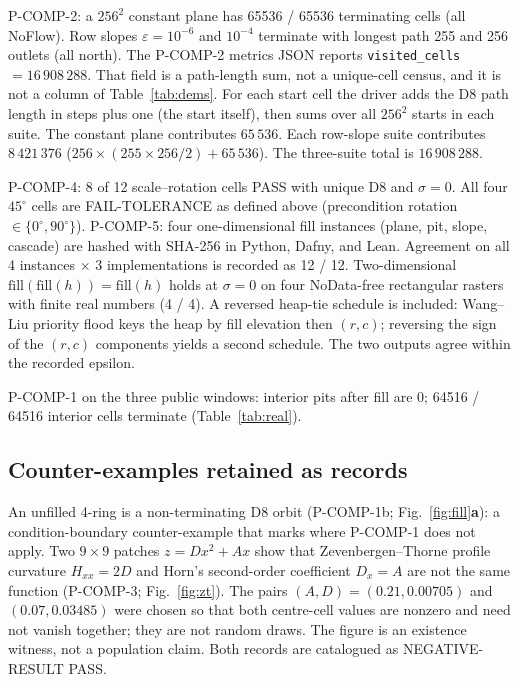 \documentclass[11pt,a4paper]{article}
\begin{document}
P-COMP-2: a $256^{2}$ constant plane has 65536 / 65536 terminating cells
(all NoFlow). Row slopes $\varepsilon=10^{-6}$ and $10^{-4}$ terminate
with longest path 255 and 256 outlets (all north). The P-COMP-2 metrics JSON reports \texttt{visited\_cells} $=16\,908\,288$.
That field is a path-length sum, not a unique-cell census, and it is not
a column of Table~\ref*{tab:dems}. For each start cell the driver adds the
D8 path length in steps plus one (the start itself), then sums over all
$256^{2}$ starts in each suite. The constant plane contributes
$65\,536$. Each row-slope suite contributes $8\,421\,376$
($256\times(255\times256/2)+65\,536$). The three-suite total is
$16\,908\,288$.

P-COMP-4: 8 of 12 scale--rotation cells PASS with unique D8 and
$\sigma=0$. All four $45^{\circ}$ cells are FAIL-TOLERANCE as defined
above (precondition rotation $\in\{0^{\circ},90^{\circ}\}$). P-COMP-5:
four one-dimensional fill instances (plane, pit, slope,
cascade) are hashed with SHA-256 in Python, Dafny, and Lean. Agreement
on all 4 instances $\times$ 3 implementations is recorded as 12 / 12.
Two-dimensional $\mathrm{fill}(\mathrm{fill}(h))=\mathrm{fill}(h)$ holds
at $\sigma=0$ on four NoData-free rectangular rasters with finite real
numbers (4 / 4). A reversed heap-tie schedule is included: Wang--Liu
priority flood keys the heap by fill elevation then $(r,c)$; reversing
the sign of the $(r,c)$ components yields a second schedule. The two
outputs agree within the recorded epsilon.

P-COMP-1 on the three public windows: interior pits after fill are 0;
64516 / 64516 interior cells terminate (Table~\ref*{tab:real}).

\subsection{Counter-examples retained as records}

An unfilled 4-ring is a non-terminating D8 orbit (P-COMP-1b;
Fig.~\ref*{fig:fill}\textbf{a}): a condition-boundary counter-example that
marks where P-COMP-1 does not apply. Two $9\times9$ patches
$z=Dx^{2}+Ax$ show that Zevenbergen--Thorne profile curvature
$H_{xx}=2D$ and Horn's second-order coefficient $D_x=A$ are not the same
function (P-COMP-3; Fig.~\ref*{fig:zt}). The pairs
$(A,D)=(0.21,0.00705)$ and $(0.07,0.03485)$ were chosen so that both
centre-cell values are nonzero and need not vanish together; they are
not random draws. The figure is an existence witness, not a population
claim. Both records are catalogued as NEGATIVE-RESULT PASS.
\end{document}
